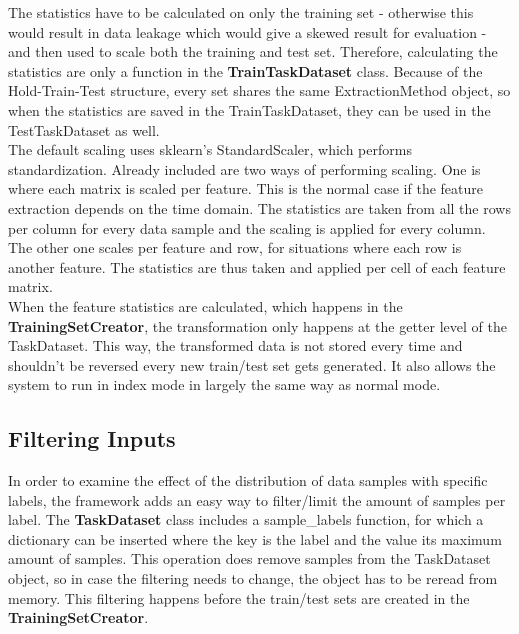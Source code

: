 The statistics have to be calculated on only the training set - otherwise this would result in data leakage which would give a skewed result for evaluation - and then used to scale both the training and test set. Therefore, calculating the statistics are only a function in the \textbf{TrainTaskDataset} class. Because of the Hold-Train-Test structure, every set shares the same ExtractionMethod object, so when the statistics are saved in the TrainTaskDataset, they can be used in the TestTaskDataset as well. \\

The default scaling uses sklearn's StandardScaler, which performs standardization. Already included are two ways of performing scaling. One is where each matrix is scaled per feature. This is the normal case if the feature extraction depends on the time domain. The statistics are taken from all the rows per column for every data sample and the scaling is applied for every column. The other one scales per feature and row, for situations where each row is another feature. The statistics are thus taken and applied per cell of each feature matrix. \\

When the feature statistics are calculated, which happens in the \textbf{TrainingSetCreator}, the transformation only happens at the getter level of the TaskDataset. This way, the transformed data is not stored every time and shouldn't be reversed every new train/test set gets generated. It also allows the system to run in index mode in largely the same way as normal mode. \\

\subsection{Filtering Inputs} \label{Impl:DataLoad:Filter}

In order to examine the effect of the distribution of data samples with specific labels, the framework adds an easy way to filter/limit the amount of samples per label. The \textbf{TaskDataset} class includes a sample\_labels function, for which a dictionary can be inserted where the key is the label and the value its maximum amount of samples. This operation does remove samples from the TaskDataset object, so in case the filtering needs to change, the object has to be reread from memory. This filtering happens before the train/test sets are created in the \textbf{TrainingSetCreator}. \\


